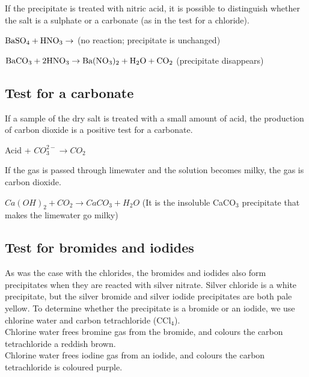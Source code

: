 If the precipitate is treated with nitric acid, it is possible to distinguish whether the salt is a sulphate or a carbonate (as in the test for a chloride).

\begin{center} 
$\rm{BaSO_{4} + HNO_{3} \rightarrow}$ (no reaction; precipitate is unchanged)

$\rm{BaCO_{3} + 2HNO_{3} \rightarrow Ba(NO_{3})_{2} + H_{2}O + CO_{2}}$ (precipitate disappears)
\end{center}

\subsection{Test for a carbonate}

If a sample of the dry salt is treated with a small amount of acid, the production of carbon dioxide is a positive test for a carbonate.

\begin{center}
Acid + \rm${CO_{3}^{2-} \rightarrow CO_{2} }$
\end{center}

If the gas is passed through limewater and the solution becomes milky, the gas is carbon dioxide.

\begin{center}
\rm${Ca(OH)_{2} + CO_{2} \rightarrow CaCO_{3} + H_{2}O}$ (It is the insoluble CaCO$_{3}$ precipitate that makes the limewater go milky)
\end{center}

\subsection{Test for bromides and iodides}

As was the case with the chlorides, the bromides and iodides also form precipitates when they are reacted with silver nitrate. Silver chloride is a white precipitate, but the silver bromide and silver iodide precipitates are both pale yellow. To determine whether the precipitate is a bromide or an iodide, we use chlorine water and carbon tetrachloride (CCl$_{4}$). \\

Chlorine water frees bromine gas from the bromide, and colours the carbon tetrachloride a reddish brown.\\

Chlorine water frees iodine gas from an iodide, and colours the carbon tetrachloride is coloured purple.

